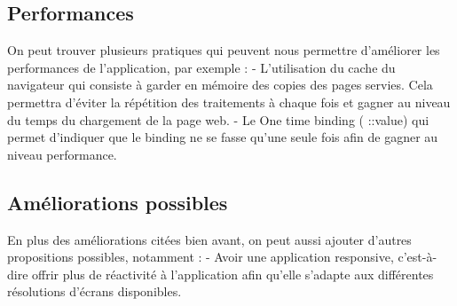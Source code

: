 \documentclass [a4paper,11pt]{article}
\begin{document}
\subsection{Performances}
On peut trouver plusieurs pratiques qui peuvent nous permettre d’améliorer les performances de l’application, par exemple :\newline
-	L’utilisation du cache du navigateur qui consiste à garder en mémoire des copies des pages servies. Cela permettra d’éviter la répétition des traitements à chaque fois et gagner au niveau du temps du chargement de la page web.\newline
-	Le One time binding ( ::value) qui permet d’indiquer que le binding ne se fasse qu’une seule fois afin de gagner au niveau performance.
\subsection{Améliorations possibles}
En plus des améliorations citées bien avant, on peut aussi ajouter d’autres propositions possibles, notamment : \newline
-	Avoir une application responsive, c’est-à-dire offrir plus de réactivité à l’application afin qu’elle s’adapte aux différentes résolutions d’écrans disponibles.


\newpage

\nocite{*}


\end{document}
